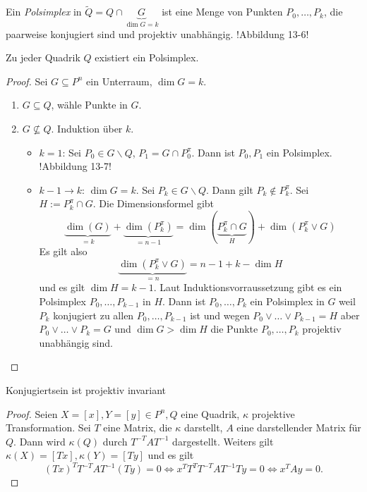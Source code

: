 \documentclass[11pt]{article}
\begin{document}
\begin{definition}
Ein \textit{Polsimplex} in $\tilde Q = Q\cap \underbrace G_{\dim G = k}$ ist eine Menge von Punkten $P_0,\dots, P_k$, die paarweise konjugiert sind und projektiv unabhängig. !Abbildung 13-6!
\end{definition}
\begin{theorem}
Zu jeder Quadrik $Q$ existiert ein Polsimplex. 
\end{theorem}
\begin{proof}
Sei $G\subseteq P^n$ ein Unterraum, $\dim G = k$.
\begin{enumerate}
    \item $G\subseteq Q$, wähle Punkte in $G$.
    \item $G\not\subseteq Q$. Induktion über $k$.\begin{itemize}
        \item $k=1$: Sei $P_0\in G\backslash Q$, $P_1 = G\cap P_0^\pi$. Dann ist $P_0,P_1$ ein Polsimplex. !Abbildung 13-7!
        \item $k-1\to k$: $\dim G = k$. Sei $P_k\in G\backslash Q$. Dann gilt $P_k\not\in P_k^\pi$. Sei $H:= P_k^\pi\cap G$. Die Dimensionsformel gibt \begin{equation*}
            \underbrace{\dim(G)}_{= k} + \underbrace{\dim(P_k^\pi)}_{=n-1} = \dim(\underbrace{P_k^\pi\cap G}_H) + \dim (P_k^\pi\lor G)
        \end{equation*}
        Es gilt also \begin{equation*}
            \underbrace{\dim(P_k^\pi\lor G)}_{=n} = n-1+k-\dim H
        \end{equation*}
        und es gilt $\dim H = k-1$. Laut Induktionsvorraussetzung gibt es ein Polsimplex $P_0, \dots, P_{k-1}$ in $H$. Dann ist  $P_0, \dots, P_k$ ein Polsimplex in $G$ weil $P_k$ konjugiert zu allen $P_0, \dots, P_{k-1}$ ist und wegen $P_0\lor \dots\lor P_{k-1}= H$ aber $P_0\lor \dots\lor P_k= G$ und $\dim G > \dim H$ die Punkte   $P_0, \dots, P_k$ projektiv unabhängig sind.
    \end{itemize}
\end{enumerate}
\end{proof}
\begin{lemma}
Konjugiertsein ist projektiv invariant
\end{lemma}
\begin{proof}
Seien $X=[x], Y = [y]\in P^n, Q$ eine Quadrik, $\kappa$ projektive Transformation. Sei $T$ eine Matrix, die $\kappa$ darstellt, $A$ eine darstellender Matrix für $Q$. Dann wird $\kappa(Q)$ durch $T^{-T}AT^{-1}$ dargestellt. Weiters gilt $\kappa(X) = [Tx],\kappa(Y) = [Ty]$ und es gilt \begin{equation*}
    (Tx)^TT^{-T}AT^{-1}(Ty) = 0 \Leftrightarrow x^TT^T T^{-T}AT^{-1}T y = 0 \Leftrightarrow x^T Ay = 0.
\end{equation*} 
\end{proof}
\end{document}
